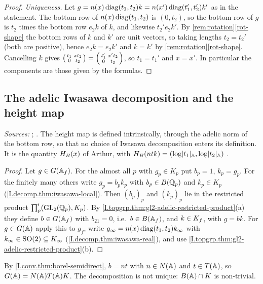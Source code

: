 \begin{proof}
\emph{Uniqueness.} Let $g=n(x)\operatorname{diag}(t_1,t_2)k=n(x')\operatorname{diag}(t_1',t_2')k'$ as in the statement. The bottom row of
$n(x)\operatorname{diag}(t_1,t_2)$ is $(0,t_2)$, so the bottom row of $g$ is $t_2$ times the bottom row $e_2k$ of $k$, and likewise
$t_2'e_2k'$. By \cref{rem:rotation}\ref{rot-shape} the bottom rows of $k$ and $k'$ are unit vectors, so taking lengths
$t_2=t_2'$ (both are positive), hence $e_2k=e_2k'$ and $k=k'$ by \cref{rem:rotation}\ref{rot-shape}. Cancelling $k$ gives
$\begin{psmallmatrix}t_1&xt_2\\0&t_2\end{psmallmatrix}=\begin{psmallmatrix}t_1'&x't_2\\0&t_2\end{psmallmatrix}$, so $t_1=t_1'$ and $x=x'$. In particular
the components are those given by the formulas.
\end{proof}

\subsection*{The adelic Iwasawa decomposition and the height map}

\noindent\emph{Sources:} \cite[§§2, 6]{AIntro}; \cite[§4.3]{GH}. The height map is defined intrinsically, through the
adelic norm of the bottom row, so that no choice of Iwasawa decomposition enters its definition. It is the
quantity $H_B(x)$ of Arthur, with $H_B(ntk)=(\log\lvert t_1\rvert_{\mathbb{A}},\log\lvert t_2\rvert_{\mathbb{A}})$ \cite[§2]{AIntro}.

\begin{theorem}
\end{theorem}
\begin{proof}
Let $g\in G(\mathbb{A}_f)$. For the almost all $p$ with $g_p\in K_p$ put $b_p=1$, $k_p=g_p$. For the finitely many others write
$g_p=b_pk_p$ with $b_p\in B(\mathbb{Q}_p)$ and $k_p\in K_p$ (\cref{I.decomp.thm:iwasawa-local}). Then $(b_p)_p$ and $(k_p)_p$
lie in the restricted product $\prod'_p(\mathrm{GL}_2(\mathbb{Q}_p),K_p)$. By \cref{I.topgrp.thm:gl2-adelic-restricted-product}(a) they
define $b\in G(\mathbb{A}_f)$ with $b_{21}=0$, i.e.\ $b\in B(\mathbb{A}_f)$, and $k\in K_f$, with $g=bk$. For $g\in G(\mathbb{A})$ apply this to
$g_f$, write $g_\infty=n(x)\operatorname{diag}(t_1,t_2)k_\infty$ with $k_\infty\in\mathrm{SO}(2)\subseteq K_\infty$
(\cref{I.decomp.thm:iwasawa-real}), and use \cref{I.topgrp.thm:gl2-adelic-restricted-product}(b).
\end{proof}
\noindent By \cref{I.conv.thm:borel-semidirect}, $b=nt$ with $n\in N(\mathbb{A})$ and $t\in T(\mathbb{A})$, so $G(\mathbb{A})=N(\mathbb{A})T(\mathbb{A})K$. The
decomposition is not unique: $B(\mathbb{A})\cap K$ is non-trivial.

